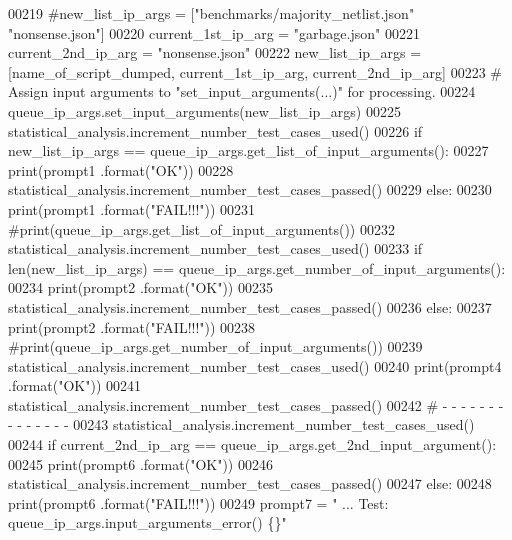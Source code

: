 \begin{DoxyCode}
00219         \textcolor{comment}{#new\_list\_ip\_args = ["benchmarks/majority\_netlist.json" "nonsense.json"]}
00220         current\_1st\_ip\_arg = \textcolor{stringliteral}{"garbage.json"}
00221         current\_2nd\_ip\_arg = \textcolor{stringliteral}{"nonsense.json"}
00222         new\_list\_ip\_args = [name\_of\_script\_dumped, current\_1st\_ip\_arg, current\_2nd\_ip\_arg]
00223         \textcolor{comment}{#   Assign input arguments to "set\_input\_arguments(...)" for processing.}
00224         queue\_ip\_args.set\_input\_arguments(new\_list\_ip\_args)
00225         statistical\_analysis.increment\_number\_test\_cases\_used()
00226         \textcolor{keywordflow}{if} new\_list\_ip\_args == queue\_ip\_args.get\_list\_of\_input\_arguments():
00227             print(prompt1 .format(\textcolor{stringliteral}{"OK"}))
00228             statistical\_analysis.increment\_number\_test\_cases\_passed()
00229         \textcolor{keywordflow}{else}:
00230             print(prompt1 .format(\textcolor{stringliteral}{"FAIL!!!"}))
00231             \textcolor{comment}{#print(queue\_ip\_args.get\_list\_of\_input\_arguments())}
00232         statistical\_analysis.increment\_number\_test\_cases\_used()
00233         \textcolor{keywordflow}{if} len(new\_list\_ip\_args) == queue\_ip\_args.get\_number\_of\_input\_arguments():
00234             print(prompt2 .format(\textcolor{stringliteral}{"OK"}))
00235             statistical\_analysis.increment\_number\_test\_cases\_passed()
00236         \textcolor{keywordflow}{else}:
00237             print(prompt2 .format(\textcolor{stringliteral}{"FAIL!!!"}))
00238             \textcolor{comment}{#print(queue\_ip\_args.get\_number\_of\_input\_arguments())}
00239         statistical\_analysis.increment\_number\_test\_cases\_used()
00240         print(prompt4 .format(\textcolor{stringliteral}{"OK"}))
00241         statistical\_analysis.increment\_number\_test\_cases\_passed()
00242         \textcolor{comment}{#   -   -   -   -   -   -   -   -   -   -   -   -   -   -}
00243         statistical\_analysis.increment\_number\_test\_cases\_used()
00244         \textcolor{keywordflow}{if} current\_2nd\_ip\_arg == queue\_ip\_args.get\_2nd\_input\_argument():
00245             print(prompt6 .format(\textcolor{stringliteral}{"OK"}))
00246             statistical\_analysis.increment\_number\_test\_cases\_passed()
00247         \textcolor{keywordflow}{else}:
00248             print(prompt6 .format(\textcolor{stringliteral}{"FAIL!!!"}))
00249         prompt7 = \textcolor{stringliteral}{" ... Test: queue\_ip\_args.input\_arguments\_error() \{\}"}

\end{DoxyCode}

